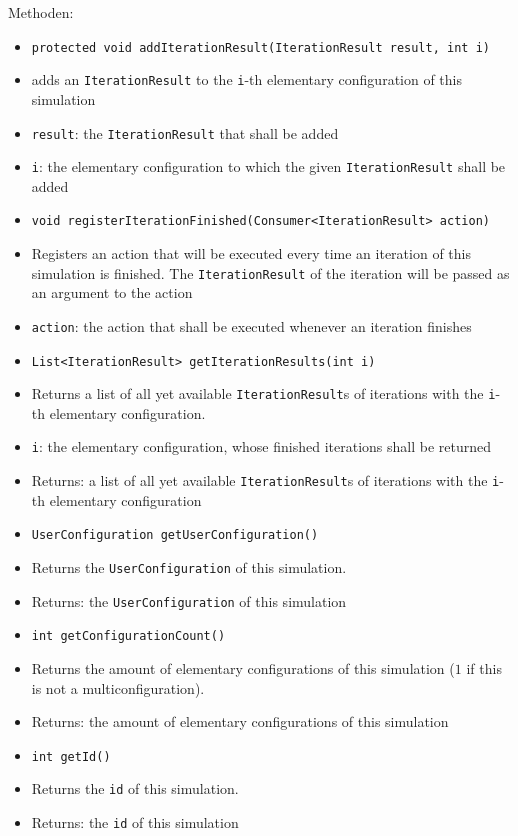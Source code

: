 \documentclass[parskip=full,11pt]{scrartcl}
\begin{document}
Methoden:
\begin{itemize}\itemsep -10pt
\item \texttt{protected void addIterationResult(IterationResult result, int i)}
\item[] adds an \texttt{IterationResult} to the \texttt{i}-th elementary configuration of this simulation
\item[] \texttt{result}: the \texttt{IterationResult} that shall be added
\item[] \texttt{i}: the elementary configuration to which the given \texttt{IterationResult} shall be added

\item \texttt{void registerIterationFinished(Consumer<IterationResult> action)}
\item[] Registers an action that will be executed every time an iteration of this simulation is finished. The \texttt{IterationResult} of the iteration will be passed as an argument to the action
\item[] \texttt{action}: the action that shall be executed whenever an iteration finishes

\item \texttt{List<IterationResult> getIterationResults(int i)}
\item[] Returns a list of all yet available \texttt{IterationResult}s of iterations with the \texttt{i}-th elementary configuration.
\item[] \texttt{i}: the elementary configuration, whose finished iterations shall be returned
\item[] Returns: a list of all yet available \texttt{IterationResult}s of iterations with the \texttt{i}-th elementary configuration

\item \texttt{UserConfiguration getUserConfiguration()}
\item[] Returns the \texttt{UserConfiguration} of this simulation.
\item[] Returns: the \texttt{UserConfiguration} of this simulation

\item \texttt{int getConfigurationCount()}
\item[] Returns the amount of elementary configurations of this simulation (\(1\) if this is not a multiconfiguration).
\item[] Returns: the amount of elementary configurations of this simulation

\item \texttt{int getId()}
\item[] Returns the \texttt{id} of this simulation.
\item[] Returns: the \texttt{id} of this simulation
\end{itemize}
\end{document}
